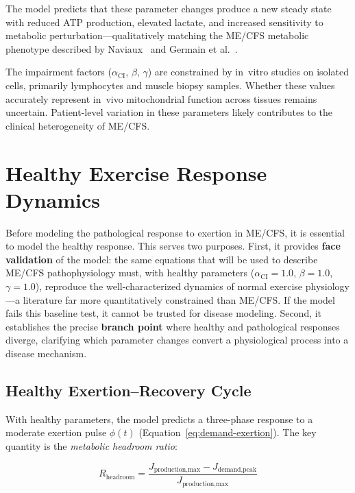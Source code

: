The model predicts that these parameter changes produce a new steady state with reduced ATP production, elevated lactate, and increased sensitivity to metabolic perturbation---qualitatively matching the ME/CFS metabolic phenotype described by Naviaux~\cite{Naviaux2016metabolomics} and Germain et al.~\cite{Germain2020metabolic}.

\begin{limitation}
The impairment factors ($\alpha_{\text{CI}}$, $\beta$, $\gamma$) are constrained by in~vitro studies on isolated cells, primarily lymphocytes and muscle biopsy samples. Whether these values accurately represent in~vivo mitochondrial function across tissues remains uncertain. Patient-level variation in these parameters likely contributes to the clinical heterogeneity of ME/CFS.
\end{limitation}

\section{Healthy Exercise Response Dynamics}
\label{sec:healthy-exercise-response}

Before modeling the pathological response to exertion in ME/CFS, it is essential to model the healthy response. This serves two purposes. First, it provides \textbf{face validation} of the model: the same equations that will be used to describe ME/CFS pathophysiology must, with healthy parameters ($\alpha_{\text{CI}} = 1.0$, $\beta = 1.0$, $\gamma = 1.0$), reproduce the well-characterized dynamics of normal exercise physiology---a literature far more quantitatively constrained than ME/CFS. If the model fails this baseline test, it cannot be trusted for disease modeling. Second, it establishes the precise \textbf{branch point} where healthy and pathological responses diverge, clarifying which parameter changes convert a physiological process into a disease mechanism.

\subsection{Healthy Exertion--Recovery Cycle}
\label{sec:healthy-exertion-recovery}

With healthy parameters, the model predicts a three-phase response to a moderate exertion pulse $\phi(t)$ (Equation~\ref{eq:demand-exertion}). The key quantity is the \emph{metabolic headroom ratio}:

\begin{equation}
\label{eq:headroom}
R_{\text{headroom}} = \frac{J_{\text{production,max}} - J_{\text{demand,peak}}}{J_{\text{production,max}}}
\end{equation}

